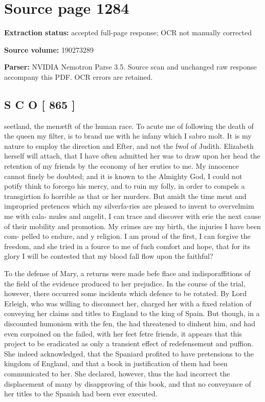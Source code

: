 \clearpage
\section{Source page 1284}
\textbf{Extraction status:} accepted full-page response; OCR not manually corrected\par
\textbf{Source volume:} 190273289\par
\textbf{Parser:} NVIDIA Nemotron Parse 3.5. Source scan and unchanged raw response accompany this PDF. OCR errors are retained.\par\medskip
\subsection*{S C O [ 865 ]}
seetland, the menætft of the human race. To acute me of following the death of the queen my filter, is to brand me with he infany which I sabro molt. It is my nature to employ the direction and Efter, and not the fwof of Judith. Elizabeth herself will attach, that I have often admitted her was to draw upon her head the retention of my friends by the economy of her eruties to me. My innocence cannot finely be doubted; and it is known to the Almighty God, I could not potify think to forcego his mercy, and to ruin my folly, in order to compels a transgirtion fo horrible as that or her murders. But amidt the time ment and impropried pretences which my silverfa-ries are pleased to invent to overvelmim me with cala- mules and angelit, I can trace and discover with erie the next cause of their mobility and promotion. My crimes are my birth, the injuries I have been com- pelled to endure, and y religion. I am proud of the first, I can forgive the freedom, and she tried in a fource to me of fuch comfort and hope, that for its glory I will be contested that my blood fall flow upon the faithful?\par\medskip
To the defense of Mary, a returns were made befe flace and indisporaffitions of the field of the evidence produced to her prejudice. In the course of the trial, however, there occurred some incidents which defence to be rotated. By Lord Erleigh, who was willing to disconnect her, charged her with a fixed relation of conveying her claims and titles to England to the king of Spain. But though, in a discounted humonism with the fen, the had threatened to dinhent him, and had even corpoined on the failed, with her feet fetre friends, it appears that this project to be eradicated as only a transient effect of redefensement and puffion. She indeed acknowledged, that the Spaniard profited to have pretensions to the kingdom of England, and that a book in justification of them had been communicated to her. She declared, however, thus the had incorrect the displacement of many by disapproving of this book, and that no conveyance of her titles to the Spanish had been ever executed.\par\medskip
